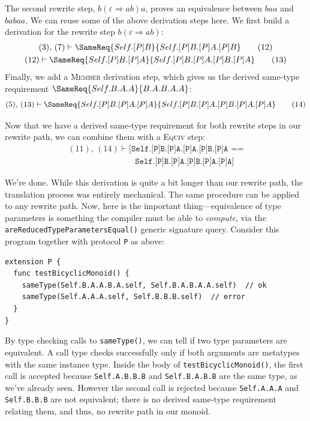 \documentclass[../generics]{subfiles}
\begin{document}
The second rewrite step, $b(\varepsilon\Rightarrow ab)a$, proves an equivalence between $baa$ and $babaa$. We can reuse some of the above derivation steps here. We first build a derivation for the rewrite step $b(\varepsilon\Rightarrow ab)$:
\begin{gather*}
(3),\,(7)\vdash\SameReq{Self.[P]B}{Self.[P]B.[P]A.[P]B}\tag{12}\\
(12)\vdash\SameReq{Self.[P]B.[P]A}{Self.[P]B.[P]A.[P]B.[P]A}\tag{13}
\end{gather*}
Finally, we add a \textsc{Member} derivation step, which gives us the derived same-type requirement $\SameReq{Self.B.A.A}{B.A.B.A.A}$:
\[
(5),\,(13)\vdash\SameReq{Self.[P]B.[P]A.[P]A}{Self.[P]B.[P]A.[P]B.[P]A.[P]A}\tag{14}
\]

Now that we have a derived same-type requirement for both rewrite steps in our rewrite path, we can combine them with a \textsc{Equiv} step:
\begin{gather*}
(11),\,(14)\vdash[\texttt{Self.[P]B.[P]A.[P]A.[P]B.[P]A ==}\\
\qquad\qquad\qquad\qquad\texttt{Self.[P]B.[P]A.[P]B.[P]A.[P]A}]\tag{15}
\end{gather*}

We're done. While this derivation is quite a bit longer than our rewrite path, the translation process was entirely mechanical. The same procedure can be applied to any rewrite path. Now, here is the important thing---equivalence of type parameters is something the compiler must be able to \emph{compute}, via the \texttt{areReducedTypeParametersEqual()} generic signature query.
Consider this program together with protocol \texttt{P} as above:
\begin{Verbatim}
extension P {
  func testBicyclicMonoid() {
    sameType(Self.B.A.A.B.A.self, Self.B.A.B.A.A.self)  // ok
    sameType(Self.A.A.A.self, Self.B.B.B.self)  // error
  }
}
\end{Verbatim}
By type checking calls to \texttt{sameType()}, we can tell if two type parameters are equivalent. A call type checks successfully only if both arguments are metatypes with the same instance type. Inside the body of \texttt{testBicyclicMonoid()}, the first call is accepted because \verb|Self.A.B.B.B| and \verb|Self.B.A.B.B| are the same type, as we've already seen. However the second call is rejected because \verb|Self.A.A.A| and \verb|Self.B.B.B| are not equivalent; there is no derived same-type requirement relating them, and thus, no rewrite path in our monoid.
\end{document}
